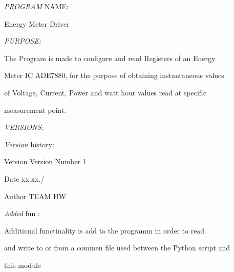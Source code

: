 



{\itshape P\-R\-O\-G\-R\-A\-M} N\-A\-M\-E\-:\par
 Energy Meter Driver

{\itshape P\-U\-R\-P\-O\-S\-E\-:} \par
 The Program is made to configure and read Registers of an Energy \par
 Meter I\-C A\-D\-E7880, for the purpose of obtaining instantaneous values \par
 of Voltage, Current, Power and watt hour values read at specific \par
 measurement point.\par


\begin{DoxyParagraph}{{\itshape V\-E\-R\-S\-I\-O\-N\-S}\-: }

\end{DoxyParagraph}
\begin{DoxyParagraph}{{\itshape Version} history\-: }

\end{DoxyParagraph}
\begin{DoxyVersion}{Version}
Version Number 1 
\end{DoxyVersion}
\begin{DoxyDate}{Date}
xx.\-xx./
\end{DoxyDate}
\begin{DoxyAuthor}{Author}
T\-E\-A\-M H\-W
\end{DoxyAuthor}
{\itshape Added} fun \-:\par
 Additional functinality is add to the programm in order to read \par
 and write to or from a commen file used between the Python script and \par
 this module \par
 

 